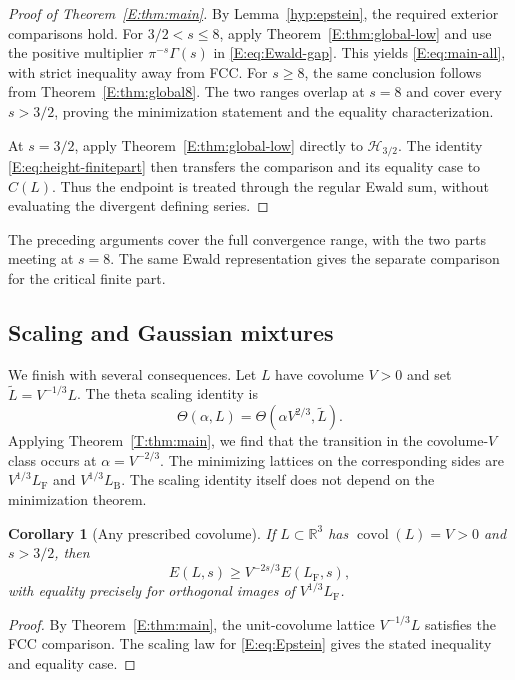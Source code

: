 \documentclass[reqno,english]{amsart}
\newtheorem{corollary}[theorem]{Corollary}
\theoremstyle{definition}
\newtheorem{open problem}[theorem]{Open Problem}
\theoremstyle{remark}
\theoremstyle{plain}
\newcommand{\R}{{\mathbb R}}
\numberwithin{equation}{section}
\newcommand{\FCC}{L_{\mathrm F}}
\newcommand{\B}{L_{\mathrm B}}
\newcommand{\BCC}{\B}
\newcommand{\HH}{\mathcal H}
\newcommand{\covol}{\operatorname{covol}}
\newcommand{\Th}{\Theta}
\begin{document}
\begin{proof}[Proof of Theorem~\ref{E:thm:main}]
By Lemma~\ref{hyp:epstein}, the required exterior comparisons
hold. For $3/2<s\le8$, apply Theorem~\ref{E:thm:global-low} and
use the positive multiplier $\pi^{-s}\Gamma(s)$ in
\eqref{E:eq:Ewald-gap}. This yields \eqref{E:eq:main-all}, with
strict inequality away from FCC. For $s\ge8$, the same conclusion
follows from Theorem~\ref{E:thm:global8}. The two ranges overlap at
$s=8$ and cover every $s>3/2$, proving the minimization statement
and the equality characterization.

At $s=3/2$, apply Theorem~\ref{E:thm:global-low} directly to
$\HH_{3/2}$. The identity \eqref{E:eq:height-finitepart} then
transfers the comparison and its equality case to $C(L)$. Thus the
endpoint is treated through the regular Ewald sum, without evaluating
the divergent defining series.
\end{proof}

The preceding arguments cover the full convergence range, with the
two parts meeting at $s=8$. The same Ewald representation gives the
separate comparison for the critical finite part.

\subsection{Scaling and Gaussian mixtures}\label{sec:consequences}
We finish with several consequences. Let $L$ have covolume $V>0$
and set $\widetilde L=V^{-1/3}L$. The theta scaling identity is
\[
 \Th(\alpha,L)=\Th(\alpha V^{2/3},\widetilde L).
\]
Applying Theorem~\ref{T:thm:main}, we find that the transition in
the covolume-$V$ class occurs at $\alpha=V^{-2/3}$. The minimizing
lattices on the corresponding sides are $V^{1/3}\FCC$ and
$V^{1/3}\BCC$. The scaling identity itself does not depend on the
minimization theorem.


\begin{corollary}[Any prescribed covolume]\label{E:cor:volume}
If $L\subset\R^3$ has $\covol(L)=V>0$ and $s>3/2$, then
\[
 E(L,s)\ge V^{-2s/3}E(\FCC,s),
\]
with equality precisely for orthogonal images of $V^{1/3}\FCC$.
\end{corollary}
\begin{proof}
By Theorem~\ref{E:thm:main}, the unit-covolume lattice
$V^{-1/3}L$ satisfies the FCC comparison. The scaling law for
\eqref{E:eq:Epstein} gives the stated inequality and equality case.
\end{proof}
\end{document}
